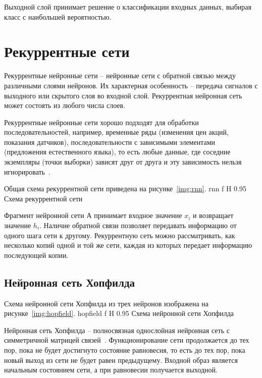Выходной слой принимает решение о классификации входных данных, выбирая класс с наибольшей вероятностью.

\section{Рекуррентные сети}
Рекуррентные нейронные сети -- нейронные сети с обратной связью между различными слоями нейронов.
Их характерная особенность -- передача сигналов с выходного или скрытого слоя во входной слой.
Рекуррентная нейронная сеть может состоять из любого числа слоев.

Рекуррентные нейронные сети хорошо подходят для обработки последовательностей, например, временные ряды (изменения цен акций, показания датчиков), последовательности с зависимыми элементами (предложения естественного языка), то есть любые данные, где соседние экземпляры (точки выборки) зависят друг от друга и эту зависимость нельзя игнорировать~\cite{дель2021прогноз}.

Общая схема рекуррентной сети приведена на рисунке~\ref{img:rnn}.
{rnn} %
{f} %
{H} %
{0.95\textwidth} %
{Схема рекуррентной сети} %

Фрагмент нейронной сети А принимает входное значение $x_i$ и возвращает значение $h_i$. 
Наличие обратной связи позволяет передавать информацию от одного шага сети к другому. 
Рекуррентную сеть можно рассматривать, как несколько копий одной и той же сети, каждая из которых передает информацию последующей копии.

\subsection{Нейронная сеть Хопфилда}
Схема нейронной сети Хопфилда из трех нейронов изображена на рисунке~\ref{img:hopfield}.
{hopfield} %
{f} %
{H} %
{0.95\textwidth} %
{Схема нейронной сети Хопфилда} %

Нейронная сеть Хопфилда -- полносвязная однослойная нейронная сеть с симметричной матрицей связей~\cite{ромасенко2022запоминание}.
Функционирование сети продолжается до тех пор, пока не будет достигнуто состояние равновесия, то есть до тех пор, пока новый выход из сети не будет равен предыдущему.
Входной образ является начальным состоянием сети, а при равновесии получается выходной.


